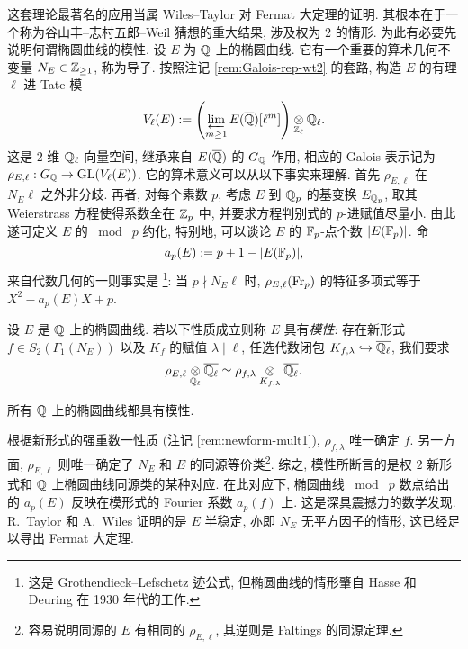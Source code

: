 这套理论最著名的应用当属 Wiles--Taylor \cite{TW95} 对 Fermat 大定理的证明. 其根本在于一个称为谷山丰--志村五郎--Weil 猜想的重大结果, 涉及权为 $2$ 的情形. 为此有必要先说明何谓椭圆曲线的模性. 设 $E$ 为 $\mathbb{Q}$ 上的椭圆曲线. 它有一个重要的算术几何不变量 $N_E \in \mathbb{Z}_{\geq 1}$, 称为导子. 按照注记 \ref{rem:Galois-rep-wt2} 的套路, 构造 $E$ 的有理 $\ell$-进 Tate 模
\[ V_\ell(E) := \left( \varprojlim_{m \geq 1} E(\overline{\mathbb{Q}})[\ell^m] \right) \underset{\mathbb{Z}_\ell}{\otimes} \mathbb{Q}_\ell. \]
这是 $2$ 维 $\mathbb{Q}_\ell$-向量空间, 继承来自 $E(\overline{\mathbb{Q}})$ 的 $G_{\mathbb{Q}}$-作用, 相应的 Galois 表示记为 $\rho_{E, \ell}: G_{\mathbb{Q}} \to \operatorname{GL}(V_\ell(E))$. 它的算术意义可以从以下事实来理解. 首先 $\rho_{E, \ell}$ 在 $N_E \ell$ 之外非分歧. 再者, 对每个素数 $p$, 考虑 $E$ 到 $\mathbb{Q}_p$ 的基变换 $E_{\mathbb{Q}_p}$, 取其 Weierstrass 方程使得系数全在 $\mathbb{Z}_p$ 中, 并要求方程判别式的 $p$-进赋值尽量小. 由此遂可定义 $E$ 的 $\bmod\; p$ 约化, 特别地, 可以谈论 $E$ 的 $\mathbb{F}_p$-点个数 $|E(\mathbb{F}_p)|$. 命
\[ a_p(E) := p + 1 - |E(\mathbb{F}_p)|, \]
来自代数几何的一则事实是 \footnote{这是 Grothendieck--Lefschetz 迹公式, 但椭圆曲线的情形肇自 Hasse 和 Deuring 在 1930 年代的工作.}: 当 $p \nmid N_E \ell$ 时, $\rho_{E, \ell}(\operatorname{Fr}_p)$ 的特征多项式等于 $X^2 - a_p(E) X + p$. 

\begin{definition}\label{def:modularity-rep}
	设 $E$ 是 $\mathbb{Q}$ 上的椭圆曲线. 若以下性质成立则称 $E$ 具有\emph{模性}: 存在新形式 $f \in S_2\left(\Gamma_1(N_E)\right)$ 以及 $K_f$ 的赋值 $\lambda \mid \ell$, 任选代数闭包 $K_{f, \lambda} \hookrightarrow \overline{\mathbb{Q}_\ell}$, 我们要求
	\[ \rho_{E, \ell} \underset{\mathbb{Q}_\ell}{\otimes} \overline{\mathbb{Q}_\ell} \simeq \rho_{f, \lambda} \underset{K_{f, \lambda}}{\otimes} \overline{\mathbb{Q}_\ell}. \]
\end{definition}

\begin{theorem}
	所有 $\mathbb{Q}$ 上的椭圆曲线都具有模性.
\end{theorem}

根据新形式的强重数一性质 (注记 \ref{rem:newform-mult1}), $\rho_{f, \lambda}$ 唯一确定 $f$. 另一方面, $\rho_{E, \ell}$ 则唯一确定了 $N_E$ 和 $E$ 的同源等价类\footnote{容易说明同源的 $E$ 有相同的 $\rho_{E, \ell}$, 其逆则是 Faltings 的同源定理.}. 综之, 模性所断言的是权 $2$ 新形式和 $\mathbb{Q}$ 上椭圆曲线同源类的某种对应. 在此对应下, 椭圆曲线 $\bmod\; p$ 数点给出的 $a_p(E)$ 反映在模形式的 Fourier 系数 $a_p(f)$ 上. 这是深具震撼力的数学发现. R.\ Taylor 和 A.\ Wiles 证明的是 $E$ 半稳定, 亦即 $N_E$ 无平方因子的情形, 这已经足以导出 Fermat 大定理. 

